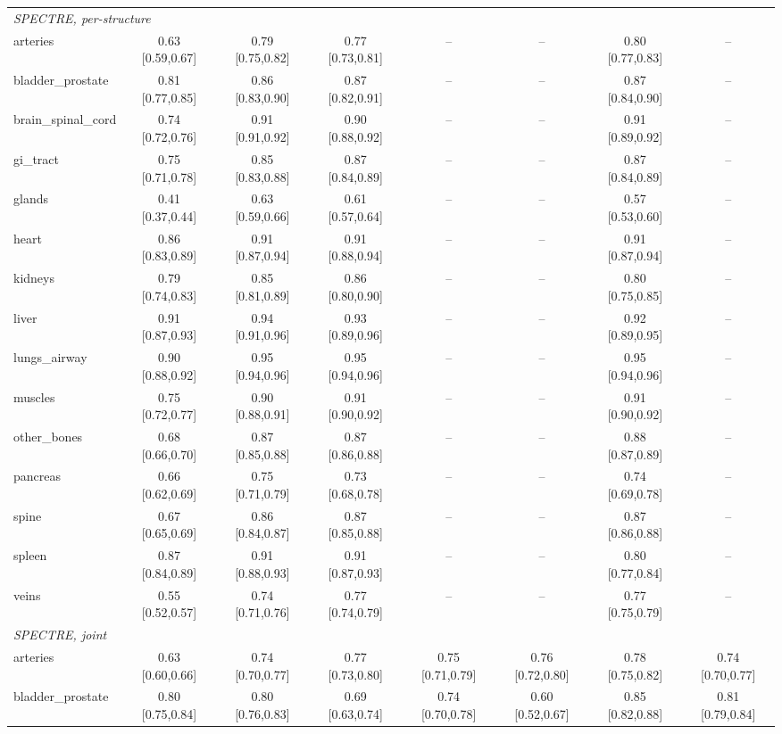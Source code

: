 \begin{tabular}{lccccccc}
\multicolumn{8}{l}{\textit{SPECTRE, per-structure}} \\
arteries & 0.63 [0.59,0.67] & 0.79 [0.75,0.82] & 0.77 [0.73,0.81] & -- & -- & 0.80 [0.77,0.83] & -- \\
bladder\_prostate & 0.81 [0.77,0.85] & 0.86 [0.83,0.90] & 0.87 [0.82,0.91] & -- & -- & 0.87 [0.84,0.90] & -- \\
brain\_spinal\_cord & 0.74 [0.72,0.76] & 0.91 [0.91,0.92] & 0.90 [0.88,0.92] & -- & -- & 0.91 [0.89,0.92] & -- \\
gi\_tract & 0.75 [0.71,0.78] & 0.85 [0.83,0.88] & 0.87 [0.84,0.89] & -- & -- & 0.87 [0.84,0.89] & -- \\
glands & 0.41 [0.37,0.44] & 0.63 [0.59,0.66] & 0.61 [0.57,0.64] & -- & -- & 0.57 [0.53,0.60] & -- \\
heart & 0.86 [0.83,0.89] & 0.91 [0.87,0.94] & 0.91 [0.88,0.94] & -- & -- & 0.91 [0.87,0.94] & -- \\
kidneys & 0.79 [0.74,0.83] & 0.85 [0.81,0.89] & 0.86 [0.80,0.90] & -- & -- & 0.80 [0.75,0.85] & -- \\
liver & 0.91 [0.87,0.93] & 0.94 [0.91,0.96] & 0.93 [0.89,0.96] & -- & -- & 0.92 [0.89,0.95] & -- \\
lungs\_airway & 0.90 [0.88,0.92] & 0.95 [0.94,0.96] & 0.95 [0.94,0.96] & -- & -- & 0.95 [0.94,0.96] & -- \\
muscles & 0.75 [0.72,0.77] & 0.90 [0.88,0.91] & 0.91 [0.90,0.92] & -- & -- & 0.91 [0.90,0.92] & -- \\
other\_bones & 0.68 [0.66,0.70] & 0.87 [0.85,0.88] & 0.87 [0.86,0.88] & -- & -- & 0.88 [0.87,0.89] & -- \\
pancreas & 0.66 [0.62,0.69] & 0.75 [0.71,0.79] & 0.73 [0.68,0.78] & -- & -- & 0.74 [0.69,0.78] & -- \\
spine & 0.67 [0.65,0.69] & 0.86 [0.84,0.87] & 0.87 [0.85,0.88] & -- & -- & 0.87 [0.86,0.88] & -- \\
spleen & 0.87 [0.84,0.89] & 0.91 [0.88,0.93] & 0.91 [0.87,0.93] & -- & -- & 0.80 [0.77,0.84] & -- \\
veins & 0.55 [0.52,0.57] & 0.74 [0.71,0.76] & 0.77 [0.74,0.79] & -- & -- & 0.77 [0.75,0.79] & -- \\
\multicolumn{8}{l}{\textit{SPECTRE, joint}} \\
arteries & 0.63 [0.60,0.66] & 0.74 [0.70,0.77] & 0.77 [0.73,0.80] & 0.75 [0.71,0.79] & 0.76 [0.72,0.80] & 0.78 [0.75,0.82] & 0.74 [0.70,0.77] \\
bladder\_prostate & 0.80 [0.75,0.84] & 0.80 [0.76,0.83] & 0.69 [0.63,0.74] & 0.74 [0.70,0.78] & 0.60 [0.52,0.67] & 0.85 [0.82,0.88] & 0.81 [0.79,0.84] \\

\end{tabular}
